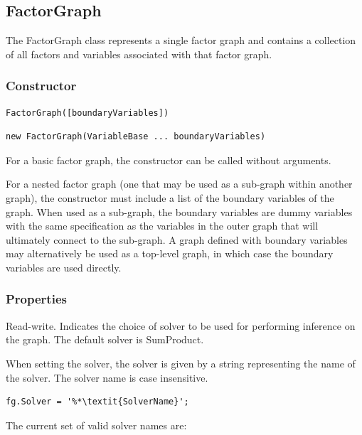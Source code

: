\subsection{FactorGraph}

The FactorGraph class represents a single factor graph and contains a collection of all factors and variables associated with that factor graph.

\subsubsection{Constructor}

\ifmatlab
\begin{lstlisting}
FactorGraph([boundaryVariables])
\end{lstlisting}
\fi

\ifjava
\begin{lstlisting}
new FactorGraph(VariableBase ... boundaryVariables)
\end{lstlisting}
\fi

For a basic factor graph, the constructor can be called without arguments.

For a nested factor graph (one that may be used as a sub-graph within another graph), the constructor must include a list of the boundary variables of the graph.  When used as a sub-graph, the boundary variables are dummy variables with the same specification as the variables in the outer graph that will ultimately connect to the sub-graph.  A graph defined with boundary variables may alternatively be used as a top-level graph, in which case the boundary variables are used directly.

\subsubsection{Properties}

\label{sec:FactorGraph.Solver}

Read-write.  Indicates the choice of solver to be used for performing inference on the graph.  The default solver is SumProduct.

\ifmatlab
When setting the solver, the solver is given by a string representing the name of the solver.  The solver name is case insensitive.

\begin{lstlisting}
fg.Solver = '%*\textit{SolverName}';
\end{lstlisting}

The current set of valid solver names are:

